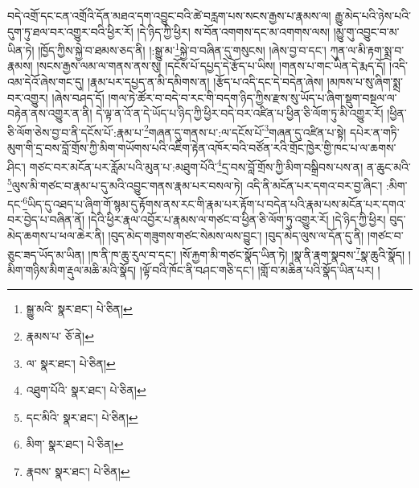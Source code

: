 བདེ་འགྲོ་དང་ངན་འགྲོའི་དོན་མཐའ་དག་འབྱུང་བའི་ཚེ་བརླག་པས་སངས་རྒྱས་པ་རྣམས་ལ། རྒྱུ་མེད་པའི་ཉེས་པའི་དུག་ཏུ་ཐལ་བར་འགྱུར་བའི་ཕྱིར་རོ། །དེ་ཉིད་ཀྱི་ཕྱིར། ས་བོན་འགགས་དང་མ་འགགས་ལས། །མྱུ་གུ་འབྱུང་བ་མ་ཡིན་ཏེ། །ཁྱོད་ཀྱིས་སྐྱེ་བ་ཐམས་ཅད་ནི། །:སྒྱུ་མ་\footnote{སྒྱུ་མའི་  སྣར་ཐང་།  པེ་ཅིན། }སྐྱེ་བ་བཞིན་དུ་གསུངས། །ཞེས་བྱ་བ་དང་། ཀུན་ལ་མི་རྟག་སྨྲ་བ་རྣམས། །སངས་རྒྱས་ལམ་ལ་གནས་ནས་སུ། །དངོས་པོ་དཔྱད་དེ་རྩོད་པ་ཡིས། །གནས་པ་གང་ཡིན་དེ་རྨད་དོ། །འདི་འམ་དེའོ་ཞེས་གང་དུ། །རྣམ་པར་དཔྱད་ན་མི་དམིགས་ན། །རྩོད་པ་འདི་དང་དེ་བདེན་ཞེས། །མཁས་པ་སུ་ཞིག་སྨྲ་བར་འགྱུར། །ཞེས་བཤད་དོ། །གལ་ཏེ་ཚོར་བ་བདེ་བ་རང་གི་བདག་ཉིད་ཀྱིས་རྫས་སུ་ཡོད་པ་ཞིག་སྡུག་བསྔལ་ལ་བརྟེན་ནས་འགྱུར་ན་ནི། དེ་ལྟ་ན་འོ་ན་དེ་ཡོད་པ་ཉིད་ཀྱི་ཕྱིར་བདེ་བར་འཛིན་པ་ཕྱིན་ཅི་ལོག་ཏུ་མི་འགྱུར་རོ། །ཕྱིན་ཅི་ལོག་ཅེས་བྱ་བ་ནི་དངོས་པོ་:རྣམ་པ་\footnote{རྣམས་པ་  ཅོ་ནེ། }གཞན་དུ་གནས་པ་:ལ་དངོས་པོ་\footnote{ལ་  སྣར་ཐང་།  པེ་ཅིན། }གཞན་དུ་འཛིན་པ་སྟེ། དཔེར་ན་གཏི་མུག་གི་དྲ་བས་བློ་གྲོས་ཀྱི་མིག་གཡོགས་པའི་འཇིག་རྟེན་འཁོར་བའི་བཙོན་རའི་གྲོང་ཁྱེར་གྱི་ཁང་པ་ལ་ཆགས་ཤིང་། གཙང་བར་མངོན་པར་རློམ་པའི་མུན་པ་:མཐུག་པོའི་\footnote{འཐུག་པོའི་  སྣར་ཐང་།  པེ་ཅིན། }དྲ་བས་བློ་གྲོས་ཀྱི་མིག་བསྒྲིབས་པས་ན། ན་ཆུང་མའི་\footnote{དང་མིའི་  སྣར་ཐང་།  པེ་ཅིན། }ལུས་མི་གཙང་བ་རྣམ་པ་དུ་མའི་འབྱུང་གནས་རྣམ་པར་བསལ་ཏེ། འདི་ནི་མངོན་པར་དགའ་བར་བྱ་ཞིང་། :མིག་དང་\footnote{མིག་  སྣར་ཐང་།  པེ་ཅིན། }ཡིད་དུ་འཐད་པ་ཞིག་གོ་སྙམ་དུ་རྟོགས་ནས་རང་གི་རྣམ་པར་རྟོག་པ་བདེན་པའི་རྣམ་པས་མངོན་པར་དགའ་བར་བྱེད་པ་བཞིན་ནོ། །དེའི་ཕྱིར་རྣལ་འབྱོར་པ་རྣམས་ལ་གཙང་བ་ཕྱིན་ཅི་ལོག་ཏུ་འགྱུར་རོ། །དེ་ཉིད་ཀྱི་ཕྱིར། བུད་མེད་ཆགས་པ་ཕལ་ཆེར་ནི། །བུད་མེད་གཟུགས་གཙང་སེམས་ལས་བྱུང་། །བུད་མེད་ལུས་ལ་དོན་དུ་ནི། །གཙང་བ་ཅུང་ཟད་ཡོད་མ་ཡིན། །ཁ་ནི་ཁ་ཆུ་རུལ་བ་དང་། །སོ་རྐྱག་མི་གཙང་སྣོད་ཡིན་ཏེ། །སྣ་ནི་རྣག་སྣབས་\footnote{རྣབས་  སྣར་ཐང་།  པེ་ཅིན། }སྣ་ཆུའི་སྣོད། །མིག་གཉིས་མིག་རྡུལ་མཆི་མའི་སྣོད། །ལྟོ་བའི་ཁོང་ནི་བཤང་གཅི་དང་། །གློ་བ་མཆིན་པའི་སྣོད་ཡིན་པར། །
